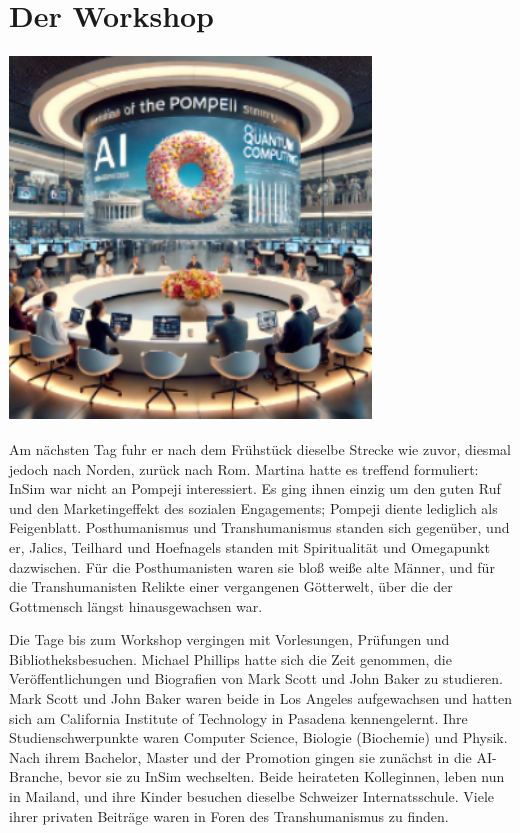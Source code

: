 \documentclass[
]{article}
\begin{document}
\section{Der Workshop}\label{der-workshop}

\includegraphics[width=3.78224in,height=3.82538in]{media/image13.png}

Am nächsten Tag fuhr er nach dem Frühstück dieselbe Strecke wie zuvor,
diesmal jedoch nach Norden, zurück nach Rom. Martina hatte es treffend
formuliert: InSim war nicht an Pompeji interessiert. Es ging ihnen
einzig um den guten Ruf und den Marketingeffekt des sozialen
Engagements; Pompeji diente lediglich als Feigenblatt. Posthumanismus
und Transhumanismus standen sich gegenüber, und er, Jalics, Teilhard und
Hoefnagels standen mit Spiritualität und Omegapunkt dazwischen. Für die
Posthumanisten waren sie bloß weiße alte Männer, und für die
Transhumanisten Relikte einer vergangenen Götterwelt, über die der
Gottmensch längst hinausgewachsen war.

Die Tage bis zum Workshop vergingen mit Vorlesungen, Prüfungen und
Bibliotheksbesuchen. Michael Phillips hatte sich die Zeit genommen, die
Veröffentlichungen und Biografien von Mark Scott und John Baker zu
studieren. Mark Scott und John Baker waren beide in Los Angeles
aufgewachsen und hatten sich am California Institute of Technology in
Pasadena kennengelernt. Ihre Studienschwerpunkte waren Computer Science,
Biologie (Biochemie) und Physik. Nach ihrem Bachelor, Master und der
Promotion gingen sie zunächst in die AI-Branche, bevor sie zu InSim
wechselten. Beide heirateten Kolleginnen, leben nun in Mailand, und ihre
Kinder besuchen dieselbe Schweizer Internatsschule. Viele ihrer privaten
Beiträge waren in Foren des Transhumanismus zu finden.
\end{document}
